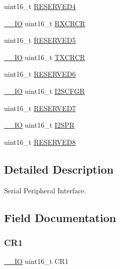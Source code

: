 \begin{DoxyCompactItemize}
\item 
uint16\+\_\+t \mbox{\hyperlink{struct_s_p_i___type_def_aa0223808025f5bf9c056185038c9d545}{R\+E\+S\+E\+R\+V\+E\+D4}}
\item 
\mbox{\hyperlink{core__sc300_8h_aec43007d9998a0a0e01faede4133d6be}{\+\_\+\+\_\+\+IO}} uint16\+\_\+t \mbox{\hyperlink{struct_s_p_i___type_def_a7ad53aa3735ccdd785e3eec02faf5eb9}{R\+X\+C\+R\+CR}}
\item 
uint16\+\_\+t \mbox{\hyperlink{struct_s_p_i___type_def_abd36010ac282682d1f3c641b183b1b6f}{R\+E\+S\+E\+R\+V\+E\+D5}}
\item 
\mbox{\hyperlink{core__sc300_8h_aec43007d9998a0a0e01faede4133d6be}{\+\_\+\+\_\+\+IO}} uint16\+\_\+t \mbox{\hyperlink{struct_s_p_i___type_def_a0238d40f977d03709c97033b8379f98f}{T\+X\+C\+R\+CR}}
\item 
uint16\+\_\+t \mbox{\hyperlink{struct_s_p_i___type_def_aab502dde158ab7da8e7823d1f8a06edb}{R\+E\+S\+E\+R\+V\+E\+D6}}
\item 
\mbox{\hyperlink{core__sc300_8h_aec43007d9998a0a0e01faede4133d6be}{\+\_\+\+\_\+\+IO}} uint16\+\_\+t \mbox{\hyperlink{struct_s_p_i___type_def_acb40abca5ca4cd2b2855adf2186effe8}{I2\+S\+C\+F\+GR}}
\item 
uint16\+\_\+t \mbox{\hyperlink{struct_s_p_i___type_def_ab1820c97e368d349f5f4121f015d9fab}{R\+E\+S\+E\+R\+V\+E\+D7}}
\item 
\mbox{\hyperlink{core__sc300_8h_aec43007d9998a0a0e01faede4133d6be}{\+\_\+\+\_\+\+IO}} uint16\+\_\+t \mbox{\hyperlink{struct_s_p_i___type_def_a02ce1ece243cc4ce1d66ebeca247fee1}{I2\+S\+PR}}
\item 
uint16\+\_\+t \mbox{\hyperlink{struct_s_p_i___type_def_afc22764fbf9ee7ce28174d65d0260f18}{R\+E\+S\+E\+R\+V\+E\+D8}}
\end{DoxyCompactItemize}


\subsection{Detailed Description}
Serial Peripheral Interface. 

\subsection{Field Documentation}
\mbox{\label{struct_s_p_i___type_def_a61400ce239355b62aa25c95fcc18a5e1}} 
\subsubsection{\texorpdfstring{CR1}{CR1}}
{\footnotesize\ttfamily \mbox{\hyperlink{core__sc300_8h_aec43007d9998a0a0e01faede4133d6be}{\+\_\+\+\_\+\+IO}} uint16\+\_\+t C\+R1}

